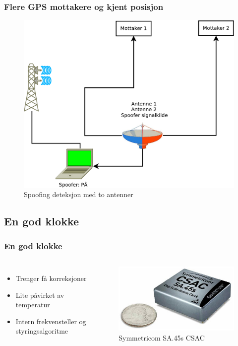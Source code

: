 \documentclass[xcolor=table]{beamer}
\begin{document}
\begin{frame} 
  \frametitle{Flere GPS mottakere og kjent posisjon}
  \begin{figure}
    \includegraphics[scale=0.23]{thesis/graphics/toantenner_2.pdf}
    \caption{Spoofing deteksjon med to antenner}
  \end{figure}
\end{frame}

\subsection{En god klokke}
\begin{frame}
  \frametitle{En god klokke}
  \begin{columns}
    \begin{itemize}
          \setlength\itemsep{2em}
      \item Trenger få korreksjoner
      \item Lite påvirket av temperatur
      \item Intern frekvensteller og styringsalgoritme
    \end{itemize}
      \begin{figure}
        \includegraphics[scale=0.2]{thesis/graphics/csac.jpg}
      \caption{Symmetricom SA.45s CSAC \cite{SADS}}
    \end{figure}
  \end{columns}
\end{frame}
\end{document}
